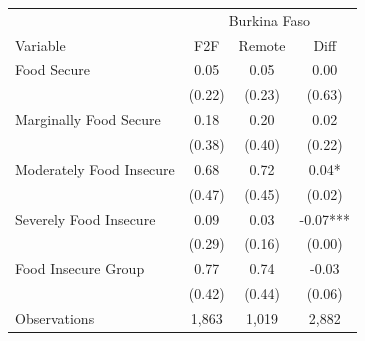 \begin{tabular}{l*{3}c}
\hline\hline
 & \multicolumn{3}{c}{Burkina Faso}\\ 
Variable & F2F & Remote & Diff \\
\hline
Food Secure&0.05&0.05&0.00\\
&(0.22)&(0.23)&(0.63)\\
Marginally Food Secure&0.18&0.20&0.02\\
&(0.38)&(0.40)&(0.22)\\
Moderately Food Insecure&0.68&0.72&0.04*\\
&(0.47)&(0.45)&(0.02)\\
Severely Food Insecure&0.09&0.03&-0.07***\\
&(0.29)&(0.16)&(0.00)\\
Food Insecure Group&0.77&0.74&-0.03\\
&(0.42)&(0.44)&(0.06)\\
\hline
Observations & 1,863 & 1,019 & 2,882 \\
\hline\hline
\end{tabular}

